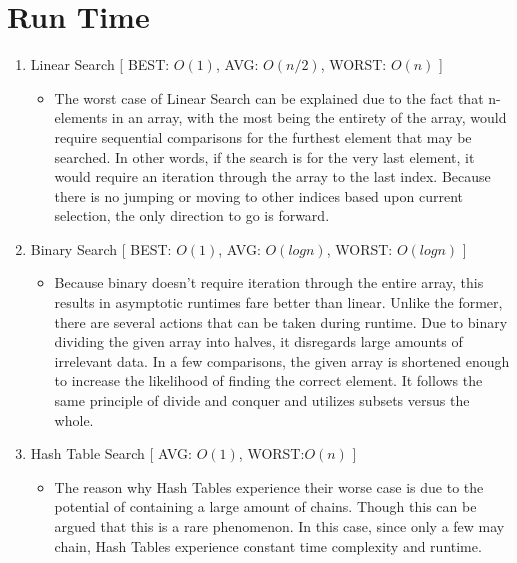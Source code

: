 \documentclass[letterpaper, 10pt,DIV=13]{scrartcl}
\numberwithin{equation}{section} %
\numberwithin{figure}{section} %
\numberwithin{table}{section} %
\begin{document}
\section{Run Time}
\bigskip
\begin{enumerate}
   \item Linear Search [ BEST: $O(1)$, AVG: $O(n/2)$, WORST: $O(n)$ ]
   \begin{itemize}
     \item The worst case of Linear Search can be explained due to the fact that n-elements in an array, with the most being the entirety of the array, would require sequential comparisons for the furthest element that may be searched. In other words, if the search is for the very last element, it would require an iteration through the array to the last index. Because there is no jumping or moving to other indices based upon current selection, the only direction to go is forward. 
   \end{itemize}
   \bigskip
   \item Binary Search [ BEST: $O(1)$, AVG:  $O(logn)$, WORST: $O(logn)$ ]
   \begin{itemize}
       \item Because binary doesn't require iteration through the entire array, this results in asymptotic runtimes fare better than linear. Unlike the former, there are several actions that can be taken during runtime. Due to binary dividing the given array into halves, it disregards large amounts of irrelevant data. In a few comparisons, the given array is shortened enough to increase the likelihood of finding the correct element. It follows the same principle of divide and conquer and utilizes subsets versus the whole. 
   \end{itemize}
   \bigskip
    
   \item Hash Table Search [ AVG: $O(1)$, WORST:$O(n)$  ]
    \begin{itemize}
        \item The reason why Hash Tables experience their worse case is due to the potential of containing a large amount of chains. Though this can be argued that this is a rare phenomenon. In this case, since only a few may chain, Hash Tables experience constant time complexity and runtime.   
    \end{itemize}
    \bigskip
      
    
\end{enumerate}
\end{document}
